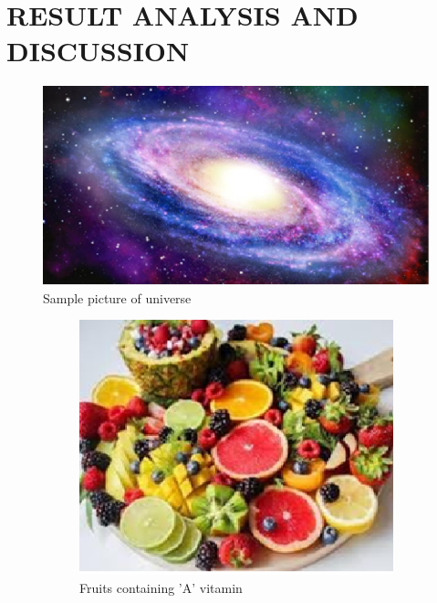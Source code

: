 \chapter{\uppercase{Result Analysis and Discussion}}
\begin{figure}[h]
    \centering
    \includegraphics[width=0.5\linewidth]{images/image1.png}
    \caption{Sample picture of universe }
    \label{fig:universe}
\end{figure}
\begin{figure}[h!]
    \centering
    \begin{subfigure}[b]{0.45\linewidth}
        \centering
        \includegraphics[width=\textwidth]{images/image2.png} %
        \caption{Fruits containing 'A' vitamin}
        \label{fig:fruitsA}
    \end{subfigure}
    \hfill
    \begin{subfigure}[b]{0.45\linewidth}
        \centering

\end{subfigure}
\end{figure}
